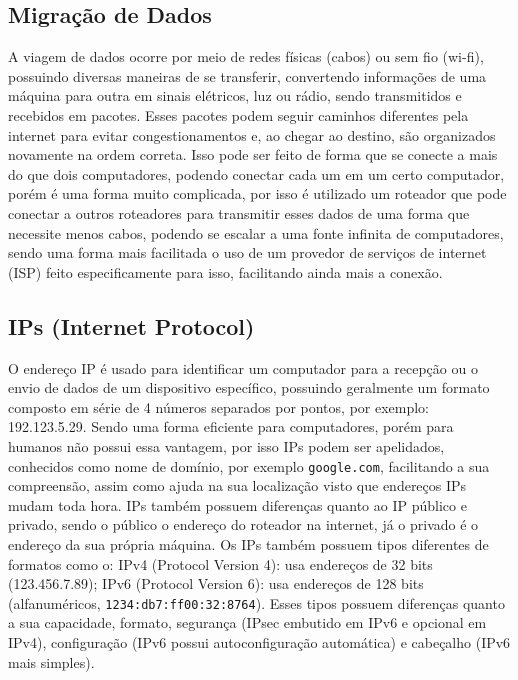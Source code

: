 	\subsection*{Migração de Dados}
	
	A viagem de dados ocorre por meio de redes físicas (cabos) ou sem fio (wi-fi), possuindo diversas maneiras de se transferir, convertendo informações de uma máquina para outra em sinais elétricos, luz ou rádio, sendo transmitidos e recebidos em pacotes. Esses pacotes podem seguir caminhos diferentes pela internet para evitar congestionamentos e, ao chegar ao destino, são organizados novamente na ordem correta. Isso pode ser feito de forma que se conecte a mais do que dois computadores, podendo conectar cada um em um certo computador, porém é uma forma muito complicada, por isso é utilizado um roteador que pode conectar a outros roteadores para transmitir esses dados de uma forma que necessite menos cabos, podendo se escalar a uma fonte infinita de computadores, sendo uma forma mais facilitada o uso de um provedor de serviços de internet (ISP) feito especificamente para isso, facilitando ainda mais a conexão.
	
	\subsection*{IPs (Internet Protocol)}
	
	O endereço IP é usado para identificar um computador para a recepção ou o envio de dados de um dispositivo específico, possuindo geralmente um formato composto em série de 4 números separados por pontos, por exemplo: 192.123.5.29. Sendo uma forma eficiente para computadores, porém para humanos não possui essa vantagem, por isso IPs podem ser apelidados, conhecidos como nome de domínio, por exemplo \texttt{google.com}, facilitando a sua compreensão, assim como ajuda na sua localização visto que endereços IPs mudam toda hora. IPs também possuem diferenças quanto ao IP público e privado, sendo o público o endereço do roteador na internet, já o privado é o endereço da sua própria máquina. Os IPs também possuem tipos diferentes de formatos como o: IPv4 (Protocol Version 4): usa endereços de 32 bits (123.456.7.89); IPv6 (Protocol Version 6): usa endereços de 128 bits (alfanuméricos, \texttt{1234:db7:ff00:32:8764}). Esses tipos possuem diferenças quanto a sua capacidade, formato, segurança (IPsec embutido em IPv6 e opcional em IPv4), configuração (IPv6 possui autoconfiguração automática) e cabeçalho (IPv6 mais simples).
	
